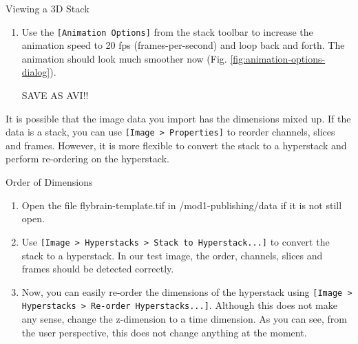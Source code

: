 \begin{taskbox}{Viewing a 3D Stack}
\begin{enumerate}
	\item Use the \texttt{[Animation Options]} from the stack toolbar to increase the animation speed to 20 fps (frames-per-second) and loop back and forth. The animation should look much smoother now (Fig. \ref{fig:animation-options-dialog}).
	
	\begin{minipage}[t]{\linewidth}
		\begin{center}
		\medskip
		\label{fig:animation-options-dialog}
		\end{center}
	\end{minipage}
	
	SAVE AS AVI!!
	
\end{enumerate}

\end{taskbox}

It is possible that the image data you import has the dimensions mixed up. If the data is a stack, you can use \texttt{[Image > Properties]} to reorder channels, slices and frames. However, it is more flexible to convert the stack to a hyperstack and perform re-ordering on the hyperstack.

\begin{taskbox}{Order of Dimensions}

\begin{enumerate}
	\item Open the file flybrain-template.tif in /mod1-publishing/data if it is not still open.
	\item Use \texttt{[Image > Hyperstacks > Stack to Hyperstack...]} to convert the stack to a hyperstack. In our test image, the order, channels, slices and frames should be detected correctly. 
	\item Now, you can easily re-order the dimensions of the hyperstack using \texttt{[Image > Hyperstacks > Re-order Hyperstacks...]}. Although this does not make any sense, change the z-dimension to a time dimension. As you can see, from the user perspective, this does not change anything at the moment.
\end{enumerate}

\end{taskbox}

